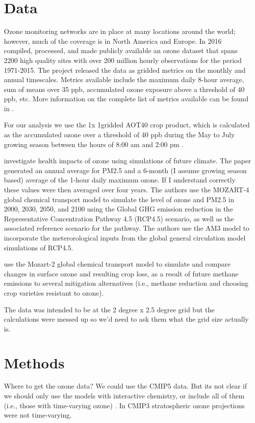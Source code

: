 \documentclass[10pt]{amsart}
\begin{document}
\section{Data}
Ozone monitoring networks are in place at many locations around the world; however, much of the coverage is in North America and Europe. 
In 2016 \cite{sofen:2016aa} compiled, processed, and made publicly available an ozone dataset that spans 2200 high quality sites with over 200 million hourly observations for the period 1971-2015.
The project released the data as gridded metrics on the monthly and annual timescales.
Metrics available include the maximum daily 8-hour average, sum of means over 35 ppb, accumulated ozone exposure above a threshold of 40 ppb, etc. 
More information on the complete list of metrics available can be found in \cite{sofen:2016aa}.

For our analysis we use the 1\degree x 1\degree gridded AOT40 crop product, which is calculated as the accumulated ozone over a threshold of 40 ppb during the May to July growing season between the hours of 8:00 am and 2:00 pm \parencite{sofen:2016aa}.

\cite{} investigate health impacts of ozone using simulations of future climate. 
The \cite{j:2013aa} paper generated an annual average for PM2.5 and a 6-month (I assume growing season based) average of the 1-hour daily maximum ozone. 
If I understand correctly these values were then averaged over four years. 
The authors use the MOZART-4 global chemical transport model to simulate the level of ozone and PM2.5 in 2000, 2030, 2050, and 2100 using the Global GHG emission reduction in the Representative Concentration Pathway 4.5 (RCP4.5) scenario, as well as the associated reference scenario for the pathway.
The authors use the AM3 model to incorporate the meterorological inputs from the global general circulation model simulations of RCP4.5.  

\cite{avnery:2013aa} use the Mozart-2 global chemical transport model to simulate and compare changes in surface ozone and resulting crop loss, as a result of future methane emissions to several mitigation alternatives (i.e., methane reduction and choosing crop varieties resistant to ozone). 

The data was intended to be at the 2 degree x 2.5 degree grid but the calculations were messed up so we'd need to ask them what the grid size actually is. 


\section{Methods}
Where to get the ozone data?
We could use the CMIP5 data.
But its not clear if we should only use the models with interactive chemistry, or include all of them (i.e., those with time-varying ozone) \parencite{eyring2013long}.
In CMIP3 stratospheric ozone projections were not time-varying. 

\printbibliography
\end{document}
